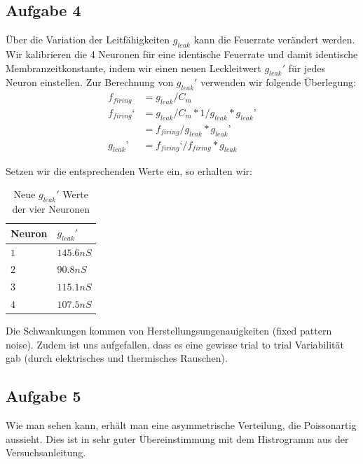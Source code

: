 \documentclass[10pt,a4paper]{scrartcl}
\begin{document}
\newpage


\subsection{Aufgabe 4}
Über die Variation der Leitfähigkeiten $g_{leak}$ kann die Feuerrate verändert werden. Wir kalibrieren die 4 Neuronen für eine identische Feuerrate und damit identische Membranzeitkonstante, indem wir einen neuen Leckleitwert $g_{leak}'$ für jedes Neuron einstellen. Zur Berechnung von $g_{leak}'$ verwenden wir folgende Überlegung:
\begin{align*}
f_{firing}&=g_{leak}/C_m\\f_{firing}‘&=g_{leak}/C_m*1/g_{leak}*g_{leak}’\\&=f_{firing}/g_{leak}*g_{leak}’\\g_{leak}’&=f_{firing}‘/f_{firing}*g_{leak}
\end{align*}

\noindent Setzen wir die entsprechenden Werte ein, so erhalten wir:

\begin{table}[H]
\centering
\captionsetup{justification=centering}
\caption{Neue $g_{leak}'$ Werte der vier Neuronen}
\begin{tabular}{l|l}
 Neuron&$g_{leak}'$\\
\hline
$1$&$145.6 nS$\\
$2$&$90.8 nS$\\
$3$&$115.1 nS$\\
$4$&$107.5 nS$
\end{tabular}
\label{tab:01}
\end{table}

\noindent Die Schwankungen kommen von Herstellungsungenauigkeiten (fixed pattern noise). Zudem ist uns aufgefallen, dass es eine gewisse trial to trial Variabilität gab (durch elektrisches und thermisches Rauschen). 


\subsection{Aufgabe 5}
Wie man sehen kann, erhält man eine asymmetrische Verteilung, die Poissonartig aussieht. Dies ist in sehr guter Übereinstimmung mit dem Histrogramm aus der Versuchsanleitung.
\end{document}
